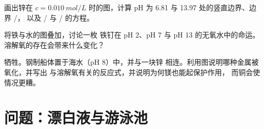 \begin{exercise}[$\star\star\star$]\label{exo:b1:e-ph-diagrams:10}
画出锌在 $c = \qty{0.010}{mol/L}$ 时的图，计算
pH 为 6.81 与 13.97 处的竖直边界、边界 /，
以及 / 与 / 的方程。
\end{exercise}

\begin{exercise}[$\star\star\star$]\label{exo:b1:e-ph-diagrams:11}
将铁与水的图叠加，讨论一枚
铁钉在 pH 2、pH 7 与 pH 13 的无氧水中的命运。
溶解氧的存在会带来什么变化？
\end{exercise}

\begin{exercise}[$\star\star\star$]\label{exo:b1:e-ph-diagrams:12}
牺牲。钢制船体置于海水（pH 8）中，并与一块锌
相连。利用图说明哪种金属被氧化，并写出
与溶解氧有关的反应式，并说明为何镁也能起保护作用，
而铜会使情况更糟。
\end{exercise}

\section{问题：漂白液与游泳池}

